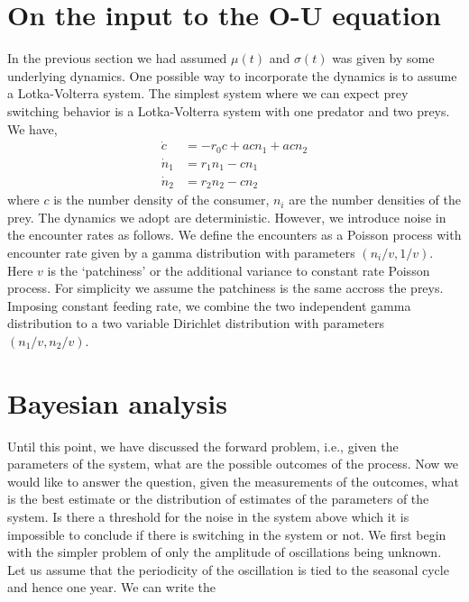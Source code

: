 \documentclass[12pt]{iopart}
\begin{document}
\section{On the input to the O-U equation}
In the previous section we had assumed $\mu(t)$ and $\sigma(t)$ was given by some underlying dynamics. One possible way to incorporate the dynamics is to assume a Lotka-Volterra system. The simplest system where we can expect prey switching behavior is a Lotka-Volterra system with one predator and two preys. We have,
\begin{align}
\label{Lotka-Volterra-system}
\dot{c} &= -r_0 c + a c n_1 + a c n_2 \nonumber \\
\dot{n}_1 &= r_1 n_1 - c n_1 \nonumber \\
\dot{n}_2 &= r_2 n_2 - c n_2 
\end{align}
where $c$ is the number density of the consumer, $n_i$ are the number densities of the prey. The dynamics we adopt are deterministic. However, we introduce noise in the encounter rates as follows. We define the encounters as a Poisson process with encounter rate given by a gamma distribution with parameters $(n_i/v, 1/v)$. Here $v$ is the `patchiness' or the additional variance to constant rate Poisson process. For simplicity we assume the patchiness is the same accross the preys. Imposing constant feeding rate, we combine the two independent gamma distribution to a two variable Dirichlet distribution with parameters $(n_1/v, n_2/v)$. 


\section{Bayesian analysis}
Until this point, we have discussed the forward problem, i.e., given the parameters of the system, what are the possible outcomes of the process. Now we would like to answer the question, given the measurements of the outcomes, what is the best estimate or the distribution of estimates of the parameters of the system. Is there a threshold for the noise in the system above which it is impossible to conclude if there is switching in the system or not. We first begin with the simpler problem of only the amplitude of oscillations being unknown. Let us assume that the periodicity of the oscillation is tied to the seasonal cycle and hence one year.
We can write the 
\end{document}
